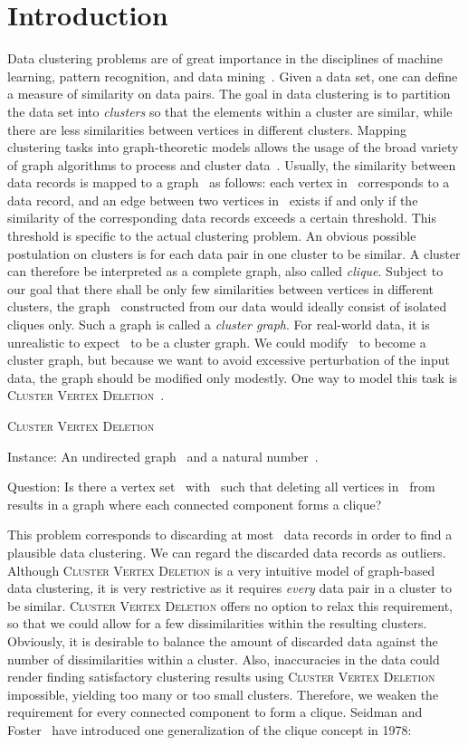 \documentclass[12pt, a4paper, abstracton]{scrreprt}
\renewcommand{\cite}{~\citep}
\newcommand{\name}{\textsc}
\newcommand{\cvd}{\name{Cluster Vertex Deletion}}
\newcommand{\decprob}[3]{\begin{flushright}
\addtolength{\linewidth}{-1em}
\begin{minipage}{\linewidth}
\textsc{#1}
\begin{compactdesc}
\item[\hspace{\parindent}Instance:] #2
\item[\hspace{\parindent}Question:] #3
\end{compactdesc}  
\end{minipage}
\addtolength{\linewidth}{1em}
\end{flushright}
}
\theoremstyle{definition}
\theoremstyle{remark}
\begin{document}
\chapter{Introduction}\label{introsec}
Data clustering problems are of great importance in the disciplines of machine learning, pattern recognition, and data mining\cite{Berkhin2006}.  Given a data set, one can define a measure of similarity on data pairs. The goal in data clustering is to partition the data set into \emph{clusters} so that the elements within a cluster are similar, while there are less similarities between vertices in different clusters. Mapping clustering tasks into graph-theoretic models allows the usage of the broad variety of graph algorithms to process and cluster data\cite{DBLP:journals/csr/Schaeffer07}. Usually, the similarity between data records is mapped to a graph~ as follows: each vertex in~ corresponds to a data record, and an edge between two vertices in~ exists if and only if the similarity of the corresponding data records exceeds a certain threshold. This threshold is specific to the actual clustering problem. An obvious possible postulation on clusters is for each data pair in one cluster to be similar. A cluster can therefore be interpreted as a complete graph, also called \emph{clique}. Subject to our goal that there shall be only few similarities between vertices in different clusters, the graph~ constructed from our data would ideally consist of isolated cliques only. Such a graph is called a \emph{cluster graph}. For real-world data, it is unrealistic to expect~ to be a cluster graph. We could modify~ to become a cluster graph, but because we want to avoid excessive perturbation of the input data, the graph should be modified only modestly. One way to model this task is \cvd\cite{HKMN09TOCS}.  \decprob{\cvd}{An undirected graph~ and a natural number~.}{Is there a vertex set~ with~ such that deleting all vertices in~ from~ results in a graph where each connected component forms a clique?}

\noindent This problem corresponds to discarding at most ~data records in order to find a plausible data clustering. We can regard the discarded data records as outliers. Although \cvd{} is a very intuitive model of graph-based data clustering, it is very restrictive as it requires \emph{every} data pair in a cluster to be similar.  \cvd{} offers no option to relax this requirement, so that we could allow for a few dissimilarities within the resulting clusters. Obviously, it is desirable to balance the amount of discarded data against the number of dissimilarities within a cluster. Also, inaccuracies in the data could render finding satisfactory clustering results using \cvd{} impossible, yielding too many or too small clusters. Therefore, we weaken the requirement for every connected component to form a clique. Seidman and Foster\cite{SF78} have introduced one generalization of the clique concept in 1978:
\end{document}

